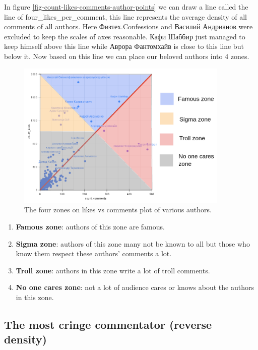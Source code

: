 \documentclass[
	11pt
] {article}
\begin{document}
	In figure \ref{fig-count-likes-comments-author-points} we can draw a line called the line of four\_likes\_per\_comment, this line represents the average density of all comments of all authors. Here Физтех.Confessions and Василий Андрианов were excluded to keep the scales of axes reasonable. Кафи Шаббир just managed to keep himself above this line while Аврора Фантомхайв is close to this line but below it. Now based on this line we can place our beloved authors into 4 zones.

	\begin{figure}[H]
		\centering
		\includegraphics[width=0.9\textwidth]{fig-likes-vs-comments-divided-into-zones}
		\caption{The four zones on likes vs comments plot of various authors.}
		\label{fig-likes-vs-comments-divided-into-zones}
	\end{figure}

	\begin{enumerate}
		\item \textbf{Famous zone}: authors of this zone are famous.
		\item \textbf{Sigma zone}: authors of this zone many not be known to all but those who know them respect these authors' comments a lot.
		\item \textbf{Troll zone}: authors in this zone write a lot of troll comments.
		\item \textbf{No one cares zone}: not a lot of audience cares or knows about the authors in this zone.
	\end{enumerate}

	\subsection{The most cringe commentator (reverse density)}
\end{document}
